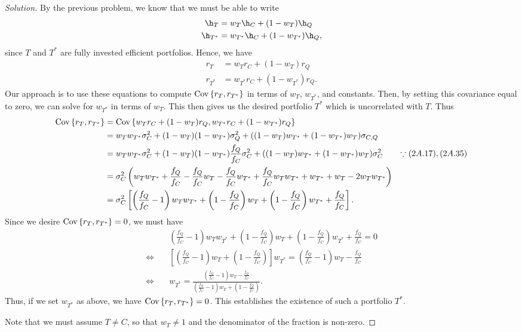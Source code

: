 \begin{proof}[Solution]
By the previous problem, we know that we must be able to write
\begin{align*}
\h_{T} &= w_{T}\h_{C} + (1 - w_{T})\h_{Q}\\
\h_{T^{\ast}} &= w_{T^{\ast}}\h_{C} + (1 - w_{T^{\ast}})\h_{Q},
\end{align*}
since $T$ and $T^{\ast}$ are fully invested efficient portfolios. Hence, we have
\begin{align*}
r_{T} &= w_{T}r_{C} + (1 - w_{T})r_{Q}\\
r_{T^{\ast}} &= w_{T^{\ast}}r_{C} + (1 - w_{T^{\ast}})r_{Q}.
\end{align*}
Our approach is to use these equations to compute $\mathrm{Cov}\left\lbrace r_{T}, r_{T^{\ast}}\right\rbrace$ in terms of $w_{T}$, $w_{T^{\ast}}$, and constants. Then, by setting this covariance equal to zero, we can solve for $w_{T^{\ast}}$ in terms of $w_{T}$. This then gives us the desired portfolio $T^{\ast}$ which is uncorrelated with $T$. Thus
\begin{align*}
\mathrm{Cov}\left\lbrace r_{T}, r_{T^{\ast}}\right\rbrace &= \mathrm{Cov}\left\lbrace w_{T}r_{C} + (1 - w_{T})r_{Q}, w_{T^{\ast}}r_{C} + (1 - w_{T^{\ast}})r_{Q}\right\rbrace \\
&= w_{T}w_{T^{\ast}}\sigma_{C}^{2} + (1 - w_{T})(1 - w_{T^{\ast}})\sigma_{Q}^{2} + ((1 - w_{T})w_{T^{\ast}} + (1 - w_{T^{\ast}})w_{T})\sigma_{C, Q}\\
&= w_{T}w_{T^{\ast}}\sigma_{C}^{2} + (1 - w_{T})(1 - w_{T^{\ast}})\frac{f_{Q}}{f_{C}}\sigma_{C}^{2} + ((1 - w_{T})w_{T^{\ast}} + (1 - w_{T^{\ast}})w_{T})\sigma_{C}^{2} & \because (2A.17), (2A.35)\\
&= \sigma_{C}^{2}\left(w_{T}w_{T^{\ast}} + \frac{f_{Q}}{f_{C}} - \frac{f_{Q}}{f_{C}}w_{T} - \frac{f_{Q}}{f_{C}}w_{T^{\ast}} + \frac{f_{Q}}{f_{C}}w_{T}w_{T^{\ast}} + w_{T^{\ast}} + w_{T} - 2w_{T}w_{T^{\ast}}\right) \\
&= \sigma_{C}^{2}\left[ \left(\frac{f_{Q}}{f_{C}} - 1 \right)w_{T}w_{T^{\ast}} + \left(1 - \frac{f_{Q}}{f_{C}}\right)w_{T} + \left(1 - \frac{f_{Q}}{f_{C}}\right)w_{T^{\ast}} + \frac{f_{Q}}{f_{C}}\right].
\end{align*}
Since we desire $\mathrm{Cov}\left\lbrace r_{T}, r_{T^{\ast}}\right\rbrace = 0$, we must have
\begin{align*}
&\left(\frac{f_{Q}}{f_{C}} - 1 \right)w_{T}w_{T^{\ast}} + \left(1 - \frac{f_{Q}}{f_{C}}\right)w_{T} + \left(1 - \frac{f_{Q}}{f_{C}}\right)w_{T^{\ast}} + \frac{f_{Q}}{f_{C}} = 0\\
\iff \quad &\left[ \left(\frac{f_{Q}}{f_{C}} - 1\right) w_{T} + \left(1 - \frac{f_{Q}}{f_{C}}\right)\right]w_{T^{\ast}} = \left(\frac{f_{Q}}{f_{C}} - 1\right)w_{T} - \frac{f_{Q}}{f_{C}}\\
\iff \quad &w_{T^{\ast}} = \frac{\left(\frac{f_{Q}}{f_{C}} - 1\right)w_{T} -\frac{f_{Q}}{f_{C}}}{\left(\frac{f_{Q}}{f_{C}} - 1 \right)w_{T} + \left(1 - \frac{f_{Q}}{f_{C}}\right)}.
\end{align*}
Thus, if we set $w_{T^{\ast}}$ as above, we have $\mathrm{Cov}\left\lbrace r_{T}, r_{T^{\ast}}\right\rbrace = 0$. This establishes the existence of such a portfolio $T^{\ast}$.

Note that we must assume $T \neq C$, so that $w_{T} \neq 1$ and the denominator of the fraction is non-zero.
\end{proof}



